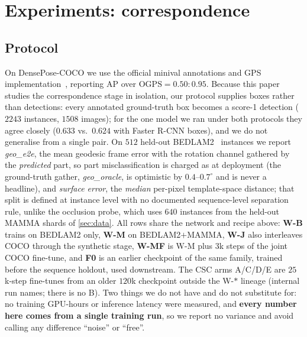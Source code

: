 \section{Experiments: correspondence}
\label{sec:exp_corr}

\subsection{Protocol}
\label{sec:exp_setup}

On DensePose-COCO we use the official minival annotations and GPS
implementation~\cite{guler2018densepose,wu2019detectron2}, reporting AP over
$\mathrm{OGPS}=0.50\!:\!0.95$. Because this paper studies the correspondence stage in isolation,
our protocol supplies boxes rather than detections: every annotated ground-truth box becomes a
score-1 detection ($2243$ instances, $1508$ images); for the one model we ran under both protocols
they agree closely ($0.633$ vs.\ $0.624$ with Faster R-CNN boxes), and we do not generalise from a
single pair. On $512$ held-out BEDLAM2~\cite{tesch2025bedlam2} instances we report
\emph{geo\_e2e}, the mean geodesic frame error with the rotation channel gathered by the
\emph{predicted} part, so part misclassification is charged as at deployment (the ground-truth
gather, \emph{geo\_oracle}, is optimistic by $0.4$--$0.7^\circ$ and is never a headline), and
\emph{surface error}, the \emph{median} per-pixel template-space distance; that split is defined at
instance level with no documented sequence-level separation rule, unlike the occlusion probe, which
uses $640$ instances from the held-out MAMMA shards of \cref{sec:data}. All rows share the network
and recipe above: \textbf{W-B} trains on BEDLAM2 only, \textbf{W-M} on BEDLAM2$+$MAMMA,
\textbf{W-J} also interleaves COCO through the synthetic stage, \textbf{W-MF} is W-M plus $3$k
steps of the joint COCO fine-tune, and \textbf{F0} is an earlier checkpoint of the same family,
trained before the sequence holdout, used downstream. The CSC arms A/C/D/E are $25$k-step
fine-tunes from an older $120$k checkpoint outside the W-$*$ lineage (internal run names; there is
no B). Two things we do not have and do not substitute for: no training GPU-hours or inference
latency were measured, and \textbf{every number here comes from a single training run}, so we
report no variance and avoid calling any difference ``noise'' or ``free''.

